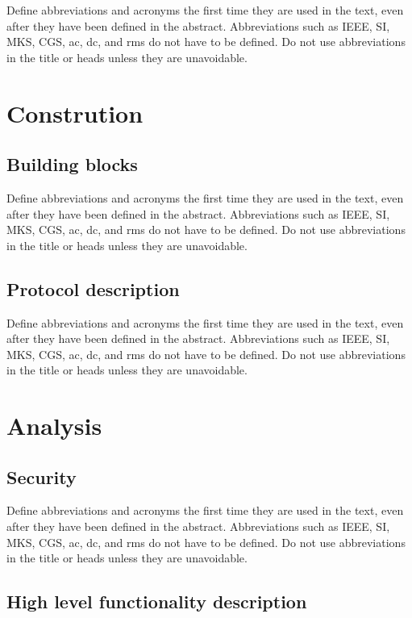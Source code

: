 \documentclass[conference]{IEEEtran}
\begin{document}
Define abbreviations and acronyms the first time they are used in the text, 
even after they have been defined in the abstract. Abbreviations such as 
IEEE, SI, MKS, CGS, ac, dc, and rms do not have to be defined. Do not use 
abbreviations in the title or heads unless they are unavoidable.

\section{Constrution}

\subsection{Building blocks}

Define abbreviations and acronyms the first time they are used in the text, 
even after they have been defined in the abstract. Abbreviations such as 
IEEE, SI, MKS, CGS, ac, dc, and rms do not have to be defined. Do not use 
abbreviations in the title or heads unless they are unavoidable.

\subsection{Protocol description}

Define abbreviations and acronyms the first time they are used in the text, 
even after they have been defined in the abstract. Abbreviations such as 
IEEE, SI, MKS, CGS, ac, dc, and rms do not have to be defined. Do not use 
abbreviations in the title or heads unless they are unavoidable.

\section{Analysis}

\subsection{Security}

Define abbreviations and acronyms the first time they are used in the text, 
even after they have been defined in the abstract. Abbreviations such as 
IEEE, SI, MKS, CGS, ac, dc, and rms do not have to be defined. Do not use 
abbreviations in the title or heads unless they are unavoidable.

\subsection{High level functionality description}
\end{document}
